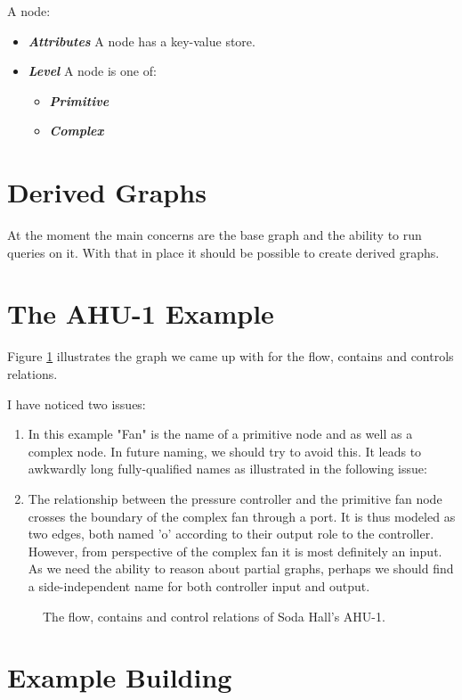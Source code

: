 \documentclass{article}
\newcommand{\textdesc}[1]{\textit{\textbf{#1}}}
\newcommand{\descitem}[1]{\item \textdesc{#1}}
\newcommand{\includeSVG}[1]{
  \texttt{[image: ./figs/\#1.pdf]}
}
\begin{document}
A node:
\begin{itemize}
  \descitem{Attributes} A node has a key-value store.
  \descitem{Level} A node is one of:
    \begin{itemize}
      \descitem{Primitive}
      \descitem{Complex}
    \end{itemize}
\end{itemize}

\section{Derived Graphs}

At the moment the main concerns are the base graph and the ability to run queries on it. With that in place it should be possible to create derived graphs.

\section{The AHU-1 Example}

Figure \ref{fig:ahu1} illustrates the graph we came up with for the flow, contains and controls relations.

I have noticed two issues:
\begin{enumerate}
  \item In this example "Fan" is the name of a primitive node and as well as a complex node. In future naming, we should try to avoid this. It leads to awkwardly long fully-qualified names as illustrated in the following issue:
  \item The relationship between the pressure controller and the primitive fan node crosses the boundary of the complex fan through a port. It is thus modeled as two edges, both named 'o' according to their output role to the controller. However, from perspective of the complex fan it is most definitely an input. As we need the ability to reason about partial graphs, perhaps we should find a side-independent name for both controller input and output.
\end{enumerate}

\begin{figure}[tp]
  \begin{center}
    \scalebox{0.8}{\includeSVG{ahu1_from_writeboard}}
  \end{center}
  \caption{The flow, contains and control relations of Soda Hall's AHU-1.}
  \label{fig:ahu1}
\end{figure}

\section{Example Building}
\end{document}

